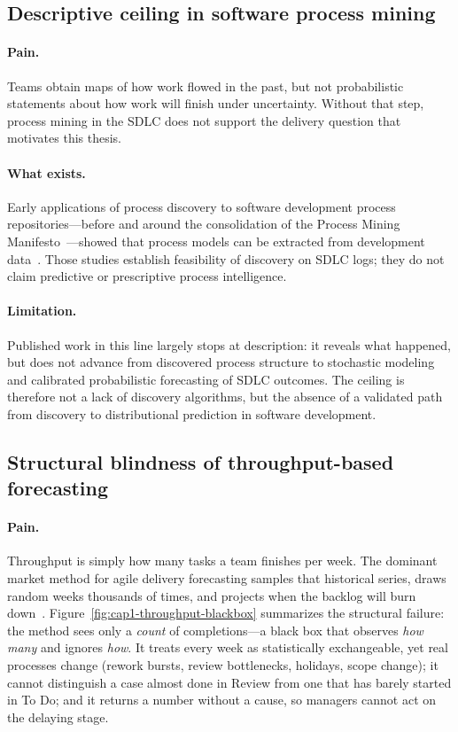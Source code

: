 \subsection{Descriptive ceiling in software process mining}

\paragraph{Pain.}
Teams obtain maps of how work flowed in the past, but not probabilistic
statements about how work will finish under uncertainty.
Without that step, process mining in the SDLC does not support the
delivery question that motivates this thesis.

\paragraph{What exists.}
Early applications of process discovery to software development process
repositories---before
and around the consolidation of the Process Mining
Manifesto~\cite{aalst2012process}---showed that process models can be
extracted from development
data~\cite{cook1998,rubin2007,poncin2011process}.
Those studies establish feasibility of discovery on SDLC logs; they do
not claim predictive or prescriptive process intelligence.

\paragraph{Limitation.}
Published work in this line largely stops at description: it reveals
what happened, but does not advance from discovered process structure to
stochastic modeling and calibrated probabilistic forecasting of SDLC
outcomes.
The ceiling is therefore not a lack of discovery algorithms, but the
absence of a validated path from discovery to distributional prediction
in software development.

\subsection{Structural blindness of throughput-based forecasting}

\paragraph{Pain.}
Throughput is simply how many tasks a team finishes per week.
The dominant market method for agile delivery forecasting samples that
historical series, draws random weeks thousands of times, and projects
when the backlog will burn down~\cite{vacanti2015}.
Figure~\ref{fig:cap1-throughput-blackbox} summarizes the structural
failure: the method sees only a \emph{count} of completions---a black box
that observes \emph{how many} and ignores \emph{how}.
It treats every week as statistically exchangeable, yet real processes
change (rework bursts, review bottlenecks, holidays, scope change);
it cannot distinguish a case almost done in Review from one that has
barely started in To Do; and it returns a number without a cause, so
managers cannot act on the delaying stage.


